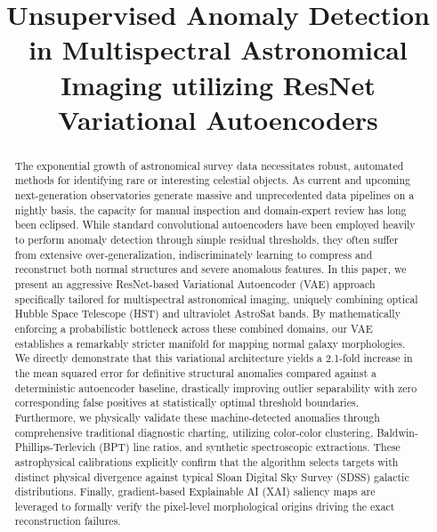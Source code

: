 \documentclass[conference]{IEEEtran}
\begin{document}
\title{Unsupervised Anomaly Detection in Multispectral Astronomical Imaging utilizing ResNet Variational Autoencoders\\}

\author{
}

\maketitle

\begin{abstract}
The exponential growth of astronomical survey data necessitates robust, automated methods for identifying rare or interesting celestial objects. As current and upcoming next-generation observatories generate massive and unprecedented data pipelines on a nightly basis, the capacity for manual inspection and domain-expert review has long been eclipsed. While standard convolutional autoencoders have been employed heavily to perform anomaly detection through simple residual thresholds, they often suffer from extensive over-generalization, indiscriminately learning to compress and reconstruct both normal structures and severe anomalous features. In this paper, we present an aggressive ResNet-based Variational Autoencoder (VAE) approach specifically tailored for multispectral astronomical imaging, uniquely combining optical Hubble Space Telescope (HST) and ultraviolet AstroSat bands. By mathematically enforcing a probabilistic bottleneck across these combined domains, our VAE establishes a remarkably stricter manifold for mapping normal galaxy morphologies. We directly demonstrate that this variational architecture yields a 2.1-fold increase in the mean squared error for definitive structural anomalies compared against a deterministic autoencoder baseline, drastically improving outlier separability with zero corresponding false positives at statistically optimal threshold boundaries. Furthermore, we physically validate these machine-detected anomalies through comprehensive traditional diagnostic charting, utilizing color-color clustering, Baldwin-Phillips-Terlevich (BPT) line ratios, and synthetic spectroscopic extractions. These astrophysical calibrations explicitly confirm that the algorithm selects targets with distinct physical divergence against typical Sloan Digital Sky Survey (SDSS) galactic distributions. Finally, gradient-based Explainable AI (XAI) saliency maps are leveraged to formally verify the pixel-level morphological origins driving the exact reconstruction failures.
\end{abstract}
\end{document}
